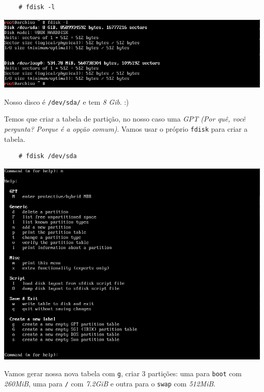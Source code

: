 \documentclass{article}
\begin{document}
\begin{verbatim}
    # fdisk -l
\end{verbatim}

\begin{center}
    \includegraphics[width=\textwidth]{Imgs/Fdisk-l.png}
\end{center}

Nosso disco é \texttt{/dev/sda/} e tem \emph{8 Gib}. :)

Temos que criar a tabela de partição,
no nosso caso uma \emph{GPT}
\textit{(Por quê, você pergunta? Porque é a opção comum)}.
Vamos usar o próprio \texttt{fdisk} para criar a tabela.

\begin{verbatim}
    # fdisk /dev/sda
\end{verbatim}

\begin{center}
    \includegraphics[width=\textwidth]{Imgs/Fdisk-help.png}
\end{center}

Vamos gerar nossa nova tabela com \texttt{g},
criar 3 partições:
uma para \texttt{boot} com \emph{260MiB},
uma para \texttt{/} com \emph{7.2GiB} e
outra para o \texttt{swap} com \emph{512MiB}.
\end{document}
